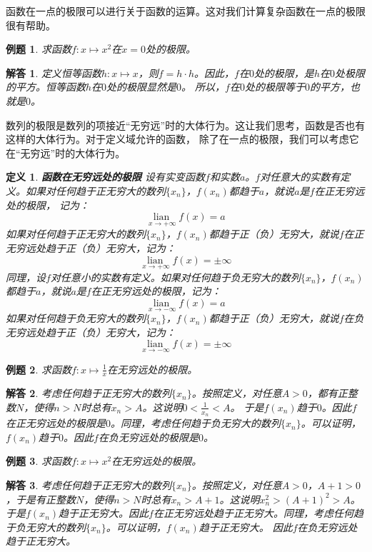 \documentclass[12pt,UTF8]{ctexbook}
\newcommand{\lian}[1]{
    \underset{#1}{\operatorname{lian}\,}
}
\newtheorem{df}{定义}[section]
\newtheorem{et}{例题}[section]
\newtheorem*{so}{解答}
\begin{document}
函数在一点的极限可以进行关于函数的运算。这对我们计算复杂函数在一点的极限很有帮助。

\begin{et}
    求函数$f:x\mapsto x^2$在$x=0$处的极限。
\end{et}
\begin{so}
    定义恒等函数$h: x\mapsto x$，则$f = h \cdot h$。因此，$f$在$0$处的极限，是$h$在$0$处极限的平方。恒等函数$h$在$0$处的极限显然是$0$。
    所以，$f$在$0$处的极限等于$0$的平方，也就是$0$。
\end{so}

数列的极限是数列的项接近“无穷远”时的大体行为。这让我们思考，函数是否也有这样的大体行为。对于定义域允许的函数，
除了在一点的极限，我们可以考虑它在“无穷远”时的大体行为。

\begin{df}{\textbf{函数在无穷远处的极限}}
    设有实变函数$f$和实数$a$。$f$对任意大的实数有定义。如果对任何趋于正无穷大的数列$\{x_n\}$，$f(x_n)$都趋于$a$，就说$a$是$f$在正无穷远处的极限，
    记为：
    $$ \lian{x\to +\infty} f(x) = a$$
    如果对任何趋于正无穷大的数列$\{x_n\}$，$f(x_n)$都趋于正（负）无穷大，就说$f$在正无穷远处趋于正（负）无穷大，记为：
    $$ \lian{x\to +\infty} f(x) = \pm\infty$$
    同理，设$f$对任意小的实数有定义。如果对任何趋于负无穷大的数列$\{x_n\}$，$f(x_n)$都趋于$a$，就说$a$是$f$在正无穷远处的极限，记为：
    $$ \lian{x\to -\infty} f(x) = a$$
    如果对任何趋于负无穷大的数列$\{x_n\}$，$f(x_n)$都趋于正（负）无穷大，就说$f$在负无穷远处趋于正（负）无穷大，记为：
    $$ \lian{x\to -\infty} f(x) = \pm\infty$$
\end{df}

\begin{et}
    求函数$f:x\mapsto \frac{1}{x}$在无穷远处的极限。
\end{et}
\begin{so}
    考虑任何趋于正无穷大的数列$\{x_n\}$。按照定义，对任意$A>0$，都有正整数$N$，使得$n>N$时总有$x_n > A$。这说明$0 < \frac{1}{x_n} < A$。
    于是$f(x_n)$趋于$0$。因此$f$在正无穷远处的极限是$0$。同理，考虑任何趋于负无穷大的数列$\{x_n\}$。可以证明，$f(x_n)$趋于$0$。因此$f$在负无穷远处的极限是$0$。
\end{so}

\begin{et}
    求函数$f:x\mapsto x^2$在无穷远处的极限。
\end{et}
\begin{so}
    考虑任何趋于正无穷大的数列$\{x_n\}$。按照定义，对任意$A>0$，$A+1>0$，于是有正整数$N$，使得$n>N$时总有$x_n > A+1$。这说明$x_n^2 > (A+1)^2 > A$。
    于是$f(x_n)$趋于正无穷大。因此$f$在正无穷远处趋于正无穷大。同理，考虑任何趋于负无穷大的数列$\{x_n\}$。可以证明，$f(x_n)$趋于正无穷大。
    因此$f$在负无穷远处趋于正无穷大。
\end{so}
\end{document}
